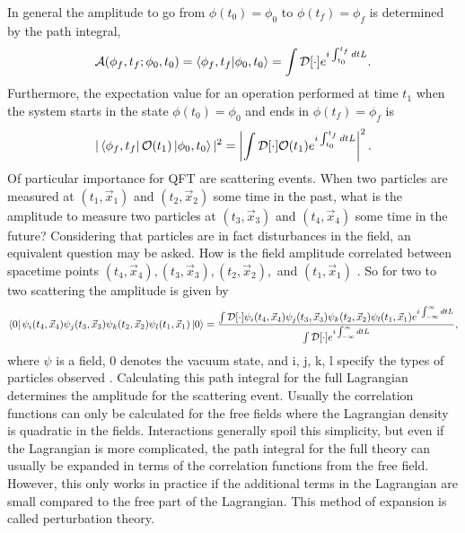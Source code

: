 \documentclass[12pt]{article}
\begin{document}
In general the amplitude to go from $\phi(t_0) = \phi_0$ to $\phi(t_f) = \phi_f$ is determined by the path integral, 
\begin{equation}
\mathcal{A}(\phi_f, t_f; \phi_0, t_0) = \braket{\phi_f,t_f|\phi_0,t_0} = \int \mathcal{D}[\cdot] e^{i\int_{t_0}^{t_f} dt L}.
\end{equation}
Furthermore, the expectation value for an operation performed at time $t_1$ when the system starts in the state $\phi(t_0) = \phi_0$ and ends in $\phi(t_f) = \phi_f$ is
\begin{equation}
|\bra{\phi_f,t_f}\mathcal{O}(t_1)\ket{\phi_0,t_0}|^2 = \left|\int \mathcal{D}[\cdot] \mathcal{O}(t_1) e^{i\int_{t_0}^{t_f} dt L}\right|^2.
\end{equation}
Of particular importance for QFT are scattering events. When two particles are measured at $(t_1,\vec{x}_1)$ and $(t_2,\vec{x}_2)$ some time in the past, what is the amplitude to measure two particles at $(t_3,\vec{x}_3)$ and $(t_4,\vec{x}_4)$ some time in the future? Considering that particles are in fact disturbances in the field, an equivalent question may be asked. How is the field amplitude correlated between spacetime points $(t_4, \vec{x}_4), (t_3, \vec{x}_3), (t_2, \vec{x}_2),$ and $(t_1, \vec{x}_1)$ \cite{zee}. So for two to two scattering the amplitude is given by
\begin{equation}
\bra{0}\psi_i(t_4,\vec{x}_4)\psi_j(t_3,\vec{x}_3)\psi_k(t_2,\vec{x}_2)\psi_l(t_1,\vec{x}_1)\ket{0} = 
\frac{\int \mathcal{D}[\cdot]\psi_i(t_4,\vec{x}_4)\psi_j(t_3,\vec{x}_3)\psi_k(t_2,\vec{x}_2)\psi_l(t_1,\vec{x}_1)
e^{i\int_{-\infty}^{\infty} dt L}}{\int \mathcal{D}[\cdot]e^{i\int_{-\infty}^{\infty} dt L}},
\end{equation}
where $\psi$ is a field, 0 denotes the vacuum state, and i, j, k, l specify the types of particles observed \cite{peskin}. Calculating this path integral for the full Lagrangian determines the amplitude for the scattering event. Usually the correlation functions can only be calculated for the free fields where the Lagrangian density is quadratic in the fields. Interactions generally spoil this simplicity, but even if the Lagrangian is more complicated, the path integral for the full theory can usually be expanded in terms of the correlation functions from the free field. However, this only works in practice if the additional terms in the Lagrangian are small compared to the free part of the Lagrangian. This method of expansion is called perturbation theory.     

\end{document}
